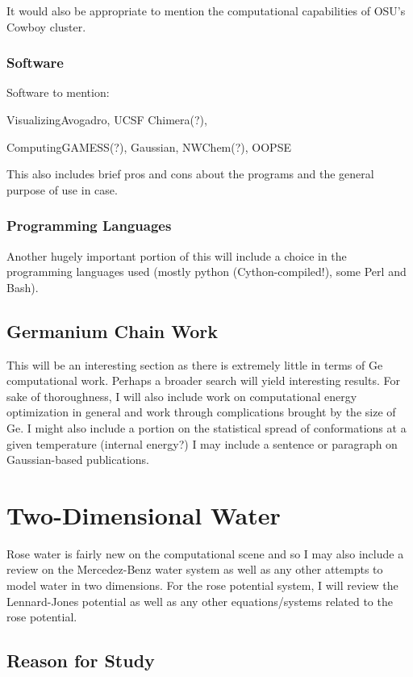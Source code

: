 It would also be appropriate to mention the computational capabilities of OSU's Cowboy cluster.

\subsubsection{Software}

Software to mention: 

Visualizing{Avogadro, UCSF Chimera(?)}, 

Computing{GAMESS(?), Gaussian, NWChem(?), OOPSE}

This also includes brief pros and cons about the programs and the general purpose of use in case.

\subsubsection{Programming Languages}

Another hugely important portion of this will include a choice in the programming languages used (mostly python (Cython-compiled!), some Perl and Bash).


\subsection{Germanium Chain Work}

This will be an interesting section as there is extremely little in terms of Ge computational work. Perhaps a broader search will yield interesting results. For sake of thoroughness, I will also include work on computational energy optimization in general and work through complications brought by the size of Ge. I might also include a portion on the statistical spread of conformations at a given temperature (internal energy?) I may include a sentence or paragraph on Gaussian-based publications. 

\section{Two-Dimensional Water}

Rose water is fairly new on the computational scene and so I may also include a review on the Mercedez-Benz water system as well as any other attempts to model water in two dimensions. For the rose potential system, I will review the Lennard-Jones potential  as well as any other equations/systems related to the rose potential.

\subsection{Reason for Study}

